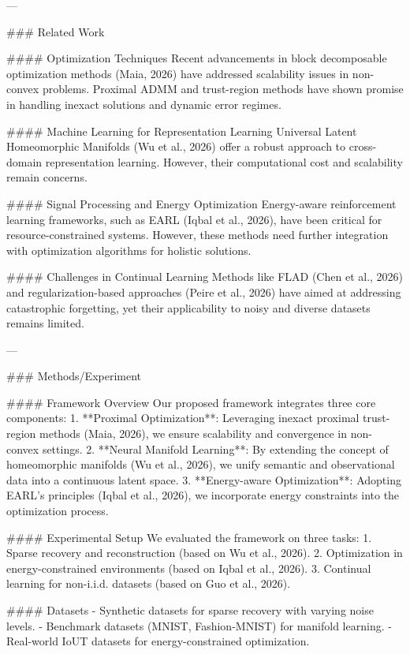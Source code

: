---

### Related Work

#### Optimization Techniques
Recent advancements in block decomposable optimization methods (Maia, 2026) have addressed scalability issues in non-convex problems. Proximal ADMM and trust-region methods have shown promise in handling inexact solutions and dynamic error regimes.

#### Machine Learning for Representation Learning
Universal Latent Homeomorphic Manifolds (Wu et al., 2026) offer a robust approach to cross-domain representation learning. However, their computational cost and scalability remain concerns.

#### Signal Processing and Energy Optimization
Energy-aware reinforcement learning frameworks, such as EARL (Iqbal et al., 2026), have been critical for resource-constrained systems. However, these methods need further integration with optimization algorithms for holistic solutions.

#### Challenges in Continual Learning
Methods like FLAD (Chen et al., 2026) and regularization-based approaches (Peire et al., 2026) have aimed at addressing catastrophic forgetting, yet their applicability to noisy and diverse datasets remains limited.

---

### Methods/Experiment

#### Framework Overview
Our proposed framework integrates three core components:
1. **Proximal Optimization**: Leveraging inexact proximal trust-region methods (Maia, 2026), we ensure scalability and convergence in non-convex settings.
2. **Neural Manifold Learning**: By extending the concept of homeomorphic manifolds (Wu et al., 2026), we unify semantic and observational data into a continuous latent space.
3. **Energy-aware Optimization**: Adopting EARL's principles (Iqbal et al., 2026), we incorporate energy constraints into the optimization process.

#### Experimental Setup
We evaluated the framework on three tasks:
1. Sparse recovery and reconstruction (based on Wu et al., 2026).
2. Optimization in energy-constrained environments (based on Iqbal et al., 2026).
3. Continual learning for non-i.i.d. datasets (based on Guo et al., 2026).

#### Datasets
- Synthetic datasets for sparse recovery with varying noise levels.
- Benchmark datasets (MNIST, Fashion-MNIST) for manifold learning.
- Real-world IoUT datasets for energy-constrained optimization.

